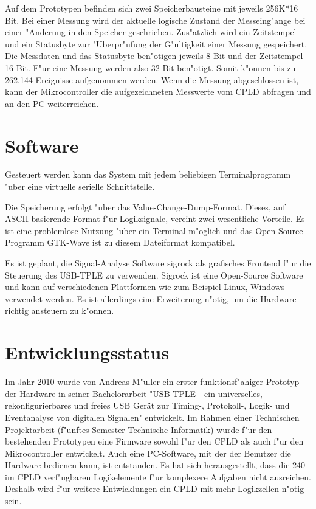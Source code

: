 \documentclass[
a4paper,
]{leaflet}
\begin{document}
Auf dem Prototypen befinden sich zwei \linebreak Speicherbausteine mit jeweils 256K*16 Bit. Bei einer Messung wird der aktuelle logische Zustand der Messeing"ange bei einer "Anderung in den Speicher geschrieben. Zus"atzlich wird ein Zeitstempel und ein Statusbyte zur "Uberpr"ufung der G"ultigkeit einer Messung gespeichert. Die Messdaten und das Statusbyte ben"otigen  jeweils 8 Bit und der Zeitstempel 16 Bit. F"ur eine Messung werden also 32 Bit ben"otigt. Somit k"onnen bis zu 262.144 Ereignisse aufgenommen werden. Wenn die Messung abgeschlossen ist, kann der Mikrocontroller die aufgezeichneten Messwerte vom CPLD abfragen und an den PC weiterreichen.

\section{Software}

Gesteuert werden kann das System mit jedem beliebigen Terminalprogramm "uber eine virtuelle serielle Schnittstelle.

Die Speicherung erfolgt "uber das Value-Change-Dump-Format. Dieses, auf ASCII basierende Format f"ur Logiksignale, vereint zwei wesentliche Vorteile. Es ist eine problemlose Nutzung "uber ein Terminal m"oglich und das Open Source Programm GTK-Wave ist zu diesem Dateiformat kompatibel.

Es ist geplant, die Signal-Analyse Software sigrock als grafisches Frontend f"ur die Steuerung des USB-TPLE zu verwenden. Sigrock ist eine Open-Source Software und kann auf verschiedenen Plattformen wie zum Beispiel Linux, Windows verwendet werden. Es ist allerdings eine Erweiterung n"otig, um die Hardware richtig ansteuern zu k"onnen.

\section{Entwicklungsstatus}

Im Jahr 2010 wurde von Andreas M"uller ein erster funktionsf"ahiger Prototyp der Hardware in seiner Bachelorarbeit "{}USB-TPLE - ein universelles, rekonfigurierbares und freies USB Ger\"at zur Timing-, Protokoll-, Logik- und Eventanalyse von digitalen Signalen"{} entwickelt. Im Rahmen einer Technischen Projektarbeit (f"unftes Semester Technische Informatik) wurde f"ur den bestehenden Prototypen eine Firmware sowohl f"ur den CPLD als auch f"ur den Mikrocontroller entwickelt. Auch eine PC-Software, mit der der Benutzer die Hardware bedienen kann, ist entstanden. Es hat sich herausgestellt, dass die 240 im CPLD verf"ugbaren Logikelemente f"ur komplexere Aufgaben nicht ausreichen. Deshalb wird f"ur weitere Entwicklungen ein CPLD mit mehr Logikzellen n"otig sein. 
\end{document}
